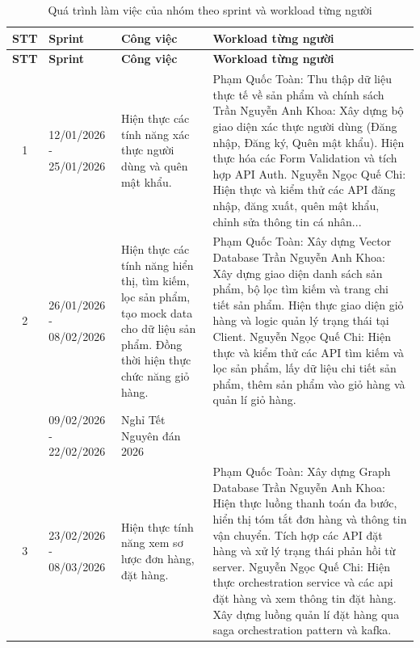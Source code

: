 \begin{longtable}{|c|p{2cm}|p{3.5cm}|p{6cm}|}
\caption{Quá trình làm việc của nhóm theo sprint và workload từng người}
\label{tab:task-assigment} \\

\hline
\textbf{STT} & \textbf{Sprint} & \textbf{Công việc} & \textbf{Workload từng người} \\
\hline
\endfirsthead

\hline
\textbf{STT} & \textbf{Sprint} & \textbf{Công việc} & \textbf{Workload từng người} \\
\hline
\endhead

\hline
\endfoot

\hline
\endlastfoot

1 & 12/01/2026 - 25/01/2026 & Hiện thực các tính năng xác thực người dùng và quên mật khẩu. &
Phạm Quốc Toàn: Thu thập dữ liệu thực tế về sản phẩm và chính sách\newline
Trần Nguyễn Anh Khoa: Xây dựng bộ giao diện xác thực người dùng (Đăng nhập, Đăng ký, Quên mật khẩu). Hiện thực hóa các Form Validation và tích hợp API Auth. \newline
Nguyễn Ngọc Quế Chi: Hiện thực và kiểm thử các API đăng nhập, đăng xuất, quên mật khẩu, chỉnh sửa thông tin cá nhân... \\ \hline

2 & 26/01/2026 - 08/02/2026 & Hiện thực các tính năng hiển thị, tìm kiếm, lọc sản phẩm, tạo mock data cho dữ liệu sản phẩm. Đồng thời hiện thực chức năng giỏ hàng. &
Phạm Quốc Toàn: Xây dựng Vector Database\newline
Trần Nguyễn Anh Khoa: Xây dựng giao diện danh sách sản phẩm, bộ lọc tìm kiếm và trang chi tiết sản phẩm. Hiện thực giao diện giỏ hàng và logic quản lý trạng thái tại Client. \newline
Nguyễn Ngọc Quế Chi: Hiện thực và kiểm thử các API tìm kiếm và lọc sản phẩm, lấy dữ liệu chi tiết sản phẩm, thêm sản phẩm vào giỏ hàng và quản lí giỏ hàng. \\ \hline

 & 09/02/2026 - 22/02/2026 & Nghỉ Tết Nguyên đán 2026 & \\ \hline

3 & 23/02/2026 - 08/03/2026 & Hiện thực tính năng xem sơ lược đơn hàng, đặt hàng. &
Phạm Quốc Toàn: Xây dựng Graph Database\newline
Trần Nguyễn Anh Khoa: Hiện thực luồng thanh toán đa bước, hiển thị tóm tắt đơn hàng và thông tin vận chuyển. Tích hợp các API đặt hàng và xử lý trạng thái phản hồi từ server. \newline
Nguyễn Ngọc Quế Chi: Hiện thực orchestration service và các api đặt hàng và xem thông tin đặt hàng. Xây dựng luồng quản lí đặt hàng qua saga orchestration pattern và kafka. \\ \hline


\end{longtable}
